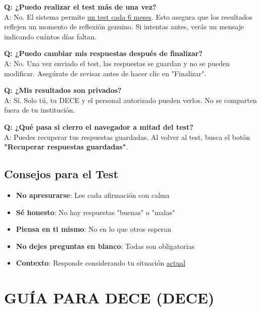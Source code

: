 \documentclass[12pt, a4paper]{report}
\newcommand{\roledece}{\textcolor{primaryblue}{\textbf{DECE}}}
\begin{document}
\textbf{Q: ¿Puedo realizar el test más de una vez?}\\
A: No. El sistema permite \underline{un test cada 6 meses}. Esto asegura que los resultados reflejen un momento de reflexión genuino. Si intentas antes, verás un mensaje indicando cuántos días faltan.

\textbf{Q: ¿Puedo cambiar mis respuestas después de finalizar?}\\
A: No. Una vez enviado el test, las respuestas se guardan y no se pueden modificar. Asegúrate de revisar antes de hacer clic en "Finalizar".

\textbf{Q: ¿Mis resultados son privados?}\\
A: Sí. Solo tú, tu DECE y el personal autorizado pueden verlos. No se comparten fuera de tu institución.

\textbf{Q: ¿Qué pasa si cierro el navegador a mitad del test?}\\
A: Puedes recuperar tus respuestas guardadas. Al volver al test, busca el botón \textbf{"Recuperar respuestas guardadas"}.

\section{Consejos para el Test}
\begin{tcolorbox}[colback=infoblue!10, colframe=infoblue, title=Consejos Importantes]
\begin{itemize}
    \item \textbf{No apresurarse}: Lee cada afirmación con calma
    \item \textbf{Sé honesto}: No hay respuestas "buenas" o "malas"
    \item \textbf{Piensa en ti mismo}: No en lo que otros esperan
    \item \textbf{No dejes preguntas en blanco}: Todas son obligatorias
    \item \textbf{Contexto}: Responde considerando tu situación \underline{actual}
\end{itemize}
\end{tcolorbox}

\chapter{GUÍA PARA DECE (\roledece)}
\end{document}
